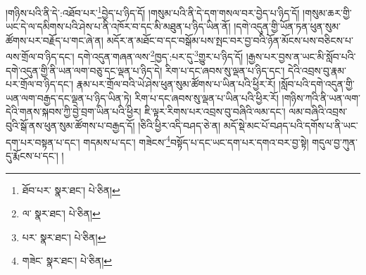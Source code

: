 །གཉིས་པའི་ནི་དེ་:འཐོབ་པར་\footnote{ཐོབ་པར་  སྣར་ཐང་།  པེ་ཅིན། }བྱེད་པ་ཉིད་དོ། །གསུམ་པའི་ནི་དེ་དག་གསལ་བར་བྱེད་པ་ཉིད་དོ། །གསུམ་ཆར་གྱི་ཡང་དེ་ལ་དམིགས་པའི་ཤེས་པ་ནི་འཁོར་བ་དང་མི་མཐུན་པ་ཉིད་ཡིན་ནོ། །དགེ་འདུན་གྱི་ཡོན་ཏན་ཕུན་སུམ་ཚོགས་པར་བརྗོད་པ་གང་ཞེ་ན། མདོར་ན་མཐོང་བ་དང་བསྒོམ་པས་སྤང་བར་བྱ་བའི་ཉོན་མོངས་པས་བཅིངས་པ་ལས་གྲོལ་བ་ཉིད་དང་། དགེ་འདུན་གཞན་ལས་\footnote{ལ་  སྣར་ཐང་།  པེ་ཅིན། }ཁྱད་:པར་དུ་\footnote{པར་  སྣར་ཐང་།  པེ་ཅིན། }གྱུར་པ་ཉིད་དོ། །རྒྱས་པར་བྱས་ན་ཡང་མི་སློབ་པའི་དགེ་འདུན་གྱི་ནི་ཡན་ལག་བཅུ་དང་ལྡན་པ་ཉིད་དེ། རིག་པ་དང་ཞབས་སུ་ལྡན་པ་ཉིད་དང་། དེའི་འབྲས་བུ་རྣམ་པར་གྲོལ་བ་ཉིད་དང་། རྣམ་པར་གྲོལ་བའི་ཡེ་ཤེས་ཕུན་སུམ་ཚོགས་པ་ཡིན་པའི་ཕྱིར་རོ། །སློབ་པའི་དགེ་འདུན་གྱི་ཡན་ལག་བརྒྱད་དང་ལྡན་པ་ཉིད་ཡིན་ཏེ། རིག་པ་དང་ཞབས་སུ་ལྡན་པ་ཡིན་པའི་ཕྱིར་རོ། །གཉིས་ཀའི་ནི་ཡན་ལག་དེའི་གནས་སྐབས་ཀྱི་བྱེ་བྲག་ཡིན་པའི་ཕྱིར། ཇི་ལྟར་རིགས་པར་འབྲས་བུ་བཞིའི་ལམ་དང་། ལམ་བཞིའི་འབྲས་བུའི་སྒོ་ནས་ཕུན་སུམ་ཚོགས་པ་བརྒྱད་དོ། །ཅིའི་ཕྱིར་འདི་བཤད་ཅེ་ན། མདོ་སྡེ་མང་པོ་བཤད་པའི་དགོས་པ་ནི་ཡང་དག་པར་བསྟན་པ་དང་། གདམས་པ་དང་། གཟེངས་\footnote{གཟེང་  སྣར་ཐང་།  པེ་ཅིན། }བསྟོད་པ་དང་ཡང་དག་པར་དགའ་བར་བྱ་སྟེ། གདུལ་བྱ་ཀུན་དུ་རྨོངས་པ་དང་། །
